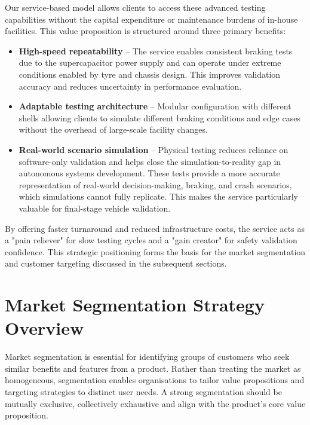 Our service-based model allows clients to access these advanced testing capabilities without the capital expenditure or maintenance burdens of in-house facilities. This value proposition is structured around three primary benefits:

\begin{itemize}
\item \textbf{High-speed repeatability} -- The service enables consistent braking tests due to the supercapacitor power supply and can operate under extreme conditions enabled by tyre and chassis design. This improves validation accuracy and reduces uncertainty in performance evaluation.

\item \textbf{Adaptable testing architecture} -- Modular configuration with different shells allowing clients to simulate different braking conditions and edge cases without the overhead of large-scale facility changes.

\item \textbf{Real-world scenario simulation} -- Physical testing reduces reliance on software-only validation and helps close the simulation-to-reality gap in autonomous systems development. These tests provide a more accurate representation of real-world decision-making, braking, and crash scenarios, which simulations cannot fully replicate. This makes the service particularly valuable for final-stage vehicle validation.
\end{itemize}

By offering faster turnaround and reduced infrastructure costs, the service acts as a "pain reliever" for slow testing cycles and a "gain creator" for safety validation confidence. This strategic positioning forms the basis for the market segmentation and customer targeting discussed in the subsequent sections.

\section{Market Segmentation Strategy Overview}

Market segmentation is essential for identifying groups of customers who seek similar benefits and features from a product. Rather than treating the market as homogeneous, segmentation enables organisations to tailor value propositions and targeting strategies to distinct user needs. A strong segmentation should be mutually exclusive, collectively exhaustive and align with the product’s core value proposition.

